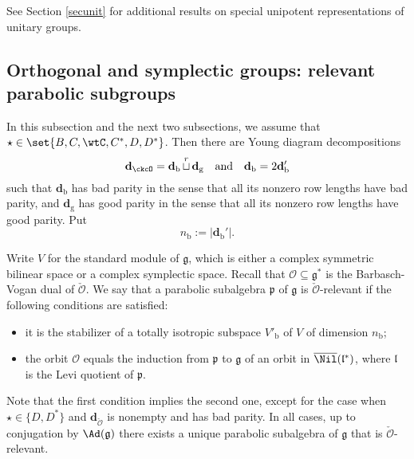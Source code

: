 \documentclass[12pt]{amsart}
\def\subset{\subseteq}
\def\abs#1{\left|{#1}\right|}
\newcommand{\CO}{{\mathcal {O}}}
\newcommand{\g}{\mathfrak g}
\newcommand{\p}{\mathfrak p}
\renewcommand{\b}{\mathfrak b}
\renewcommand{\l}{\mathfrak l}
\newcommand{\gl}{\mathfrak g \mathfrak l}
\newcommand{\Z}{\mathbb{Z}}
\newcommand{\be}{\begin {equation}}
\newcommand{\ee}{\end {equation}}
\numberwithin{equation}{section}
\theoremstyle{remark}
\def\hha{{}^a\fhh}
\def\cuprow{{\stackrel{r}{\sqcup}}}
\def\cuprow{{\,\stackrel{r}{\sqcup}\,}}
\begin{document}
See Section \ref{secunit} for additional results on special unipotent representations of unitary groups.


\subsection{Orthogonal and symplectic groups: relevant parabolic subgroups}
\label{secrgp0}
In this subsection and the next two subsections,  we assume that
$\star\in \set{ B, C, \wtC,C^*,D, D^*}$.
Then there are Young diagram decompositions
\be\label{decdo}
 \mathbf d_\ckcO=\mathbf d_\mathrm b\cuprow \mathbf d_\mathrm g\quad\textrm{and}\quad \mathbf d_\mathrm b=2 \mathbf d_\mathrm b'
\ee
 such that $\mathbf d_\mathrm b$ has bad parity in the sense that all its nonzero row
lengths have bad parity, and $\mathbf d_\mathrm g$ has good parity in the sense that all its
nonzero row lengths have good parity.
Put
\be\label{nb000}
  n_\mathrm b:=\abs{\mathbf d_\mathrm b'}. %
\ee

Write $V$ for the standard module of $ \g$, which is either a complex symmetric bilinear space or a complex symplectic space. Recall that  $\CO\subset \g^*$ is the Barbasch-Vogan dual of $\check \CO$. We say that a parabolic subalgebra
 $\p$ of $\g$ is $\check \CO$-relevant if the following conditions are satisfied:
\begin{itemize}
\item
it is the stabilizer of a totally isotropic subspace $V'_{\mathrm b}$ of $V$ of dimension $n_\mathrm b$;
\item
the orbit $\CO$ equals the induction from $\p$ to $\g$ of an orbit in $\overline{\Nil}(\l^*)$, where $\l$ is the Levi quotient of $\p$.
\end{itemize}
Note that the first condition implies the second one, except for the case when $\star\in \{D, D^*\}$ and $\mathbf d_{\check \CO}$  is nonempty and has bad parity. In all cases,   up to conjugation by $\Ad(\g)$ there exists a unique  parabolic subalgebra of $\g$ that is $\check \CO$-relevant.
\end{document}
